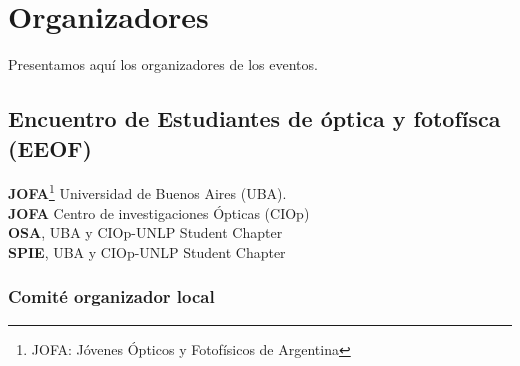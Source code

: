 \chapter{Organizadores}

Presentamos aqu\'i los organizadores de los eventos.

\section{Encuentro de Estudiantes de \'optica y fotof\'isca (EEOF)}

\textbf{JOFA}\footnote{JOFA: J\'ovenes \'Opticos y Fotof\'isicos de Argentina}
Universidad de Buenos Aires (UBA).\\

\textbf{JOFA} Centro de investigaciones \'Opticas (CIOp)\\

\textbf{OSA}, UBA y CIOp-UNLP Student Chapter\\

\textbf{SPIE}, UBA y CIOp-UNLP Student Chapter\\

\subsection{Comit\'e organizador local}


